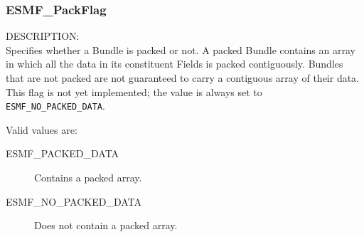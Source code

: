
\subsubsection{ESMF\_PackFlag}

\label{opt:packflag}
{\sf DESCRIPTION:\\}
Specifies whether a Bundle is packed or not.  A packed 
Bundle contains an array in which all the data in its 
constituent Fields is packed contiguously.  Bundles that
are not packed are not guaranteed to carry a contiguous 
array of their data.  This flag is not yet implemented;
the value is always set to {\tt ESMF\_NO\_PACKED\_DATA}.

Valid values are:
\begin{description}
   \item [ESMF\_PACKED\_DATA] 
         Contains a packed array.
   \item [ESMF\_NO\_PACKED\_DATA]
         Does not contain a packed array.
\end{description}







